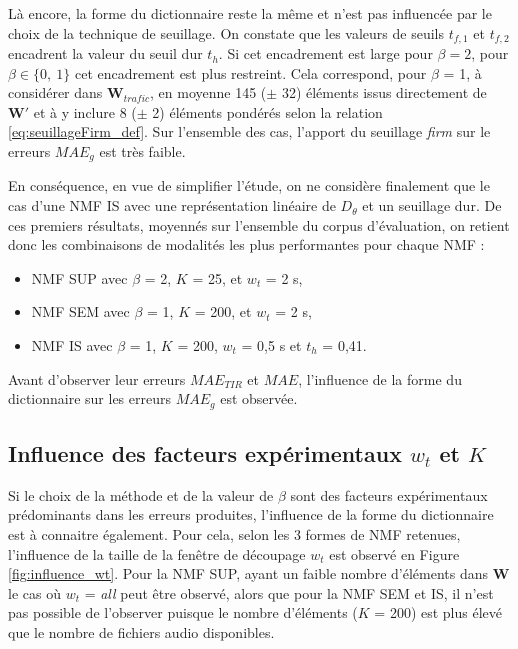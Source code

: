 Là encore, la forme du dictionnaire reste la même et n'est pas influencée par le choix de la technique de seuillage. On constate que les valeurs de seuils $t_{f,1}$ et $t_{f,2}$ encadrent la valeur du seuil dur $t_h$. Si cet encadrement est large pour $\beta = 2$, pour $\beta \in \lbrace 0,~1 \rbrace$ cet encadrement est plus restreint. Cela correspond, pour $\beta$ = 1, à considérer dans $\mathbf{W}_{trafic}$, en moyenne 145 ($\pm$ 32) éléments issus directement de $\mathbf{W'}$ et à y inclure 8 ($\pm$ 2) éléments pondérés selon la relation \ref{eq:seuillageFirm_def}. Sur l'ensemble des cas, l'apport du seuillage \textit{firm} sur le erreurs $MAE_g$ est très faible. 

En conséquence, en vue de simplifier l'étude, on ne considère finalement que le cas d'une NMF IS avec une représentation linéaire de $D_{\theta}$ et un seuillage dur. De ces premiers résultats, moyennés sur l'ensemble du corpus d'évaluation, on retient donc les combinaisons de modalités les plus performantes pour chaque NMF :

\begin{itemize}
\item NMF SUP avec $\beta$ = 2, $K$ = 25, et $w_t$ = 2 s,
\item NMF SEM avec $\beta$ = 1, $K$ = 200, et $w_t$ = 2 s,
\item NMF IS avec $\beta$ = 1, $K$ = 200, $w_t$ = 0,5 s et $t_h$ = 0,41.\\
\end{itemize}

Avant d'observer leur erreurs $MAE_{TIR}$ et $MAE$, l'influence de la forme du dictionnaire sur les erreurs $MAE_g$ est observée.

\subsection{Influence des facteurs expérimentaux $w_t$ et $K$}

Si le choix de la méthode et de la valeur de $\beta$ sont des facteurs expérimentaux prédominants dans les erreurs produites, l'influence de la forme du dictionnaire est à connaitre également. Pour cela, selon les 3 formes de NMF retenues, l'influence de la taille de la fenêtre de découpage $w_t$ est observé en Figure \ref{fig:influence_wt}. Pour la NMF SUP, ayant un faible nombre d'éléments dans $\mathbf{W}$ le cas où $w_t$ = \textit{all} peut être observé, alors que pour la NMF SEM et IS, il n'est pas possible de l'observer puisque le nombre d'éléments ($K$ = 200) est plus élevé que le nombre de fichiers audio disponibles.

